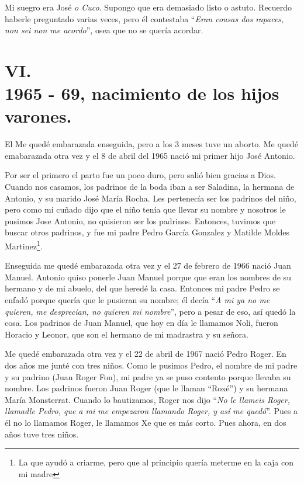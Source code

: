 \documentclass[12pt,a5paper]{book}
\begin{document}
Mi suegro era José \textit{o Cuco}. Supongo que era demasiado listo o astuto. Recuerdo haberle preguntado varias veces, pero él contestaba ``\textit{Eran cousas dos rapaces, non sei non me acordo}'', osea que no se quería acordar.


\section*{VI.\\1965 - 69, nacimiento de los hijos varones.}


El Me quedé embarazada enseguida, pero a los 3 meses tuve un aborto. Me quedé emabarazada otra vez y el 8 de abril del 1965 nació mi primer hijo José Antonio.

Por ser el primero el parto fue un poco duro, pero salió bien gracias a Dios. Cuando nos casamos, los padrinos de la boda iban a ser Saladina, la hermana de Antonio, y su marido José María Rocha. Les pertenecía ser los padrinos del niño, pero como mi cuñado dijo que el niño tenía que llevar su nombre y nosotros le pusimos Jose Antonio, no quisieron ser los padrinos. Entonces, tuvimos que buscar otros padrinos, y fue mi padre Pedro García Gonzalez y Matilde Moldes Martinez\footnote{La que ayudó a criarme, pero que al principio quería meterme en la caja con mi madre}. 

Enseguida me quedé embarazada otra vez y el 27 de febrero de 1966 nació Juan Manuel. Antonio quiso ponerle Juan Manuel porque que eran los nombres de su hermano y de mi abuelo, del que heredé la casa. Entonces mi padre Pedro se enfadó porque quería que le pusieran su nombre; él decía ``\textit{A mi ya no me quieren, me desprecian, no quieren mi nombre}'', pero a pesar de eso, así quedó la cosa. Los padrinos de Juan Manuel, que hoy en día le llamamos Noli, fueron Horacio y Leonor, que son el hermano de mi madrastra y su señora.

Me quedé embarazada otra vez y el 22 de abril de 1967 nació Pedro Roger. En dos años me junté con tres niños. Como le pusimos Pedro, el nombre de mi padre y su padrino (Juan Roger Fon), mi padre ya se puso contento porque llevaba su nombre. Los padrinos fueron Juan Roger (que le llaman “Roxé”) y su hermana María Monsterrat. Cuando lo bautizamos, Roger nos dijo ``\textit{No le llameis Roger, llamadle Pedro, que a mi me empezaron llamando Roger, y así me quedó}''. Pues a él no lo llamamos Roger, le llamamos Xe que es más corto. Pues ahora, en dos años tuve tres niños.
\end{document}
